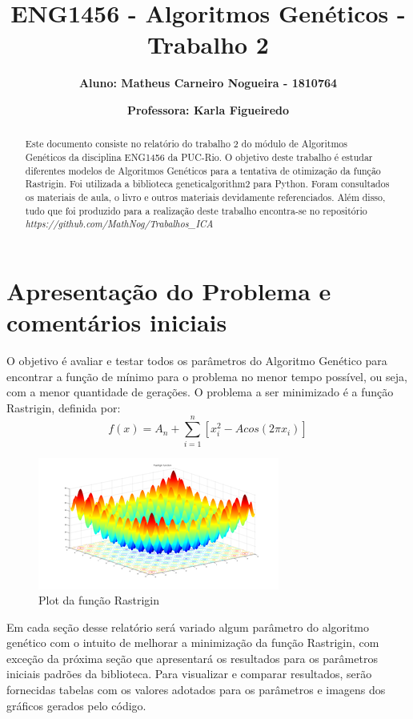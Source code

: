 \documentclass[12pt]{article}
\title{\textbf{ENG1456 - Algoritmos Genéticos - Trabalho 2}}
\author{\textbf{Aluno: Matheus Carneiro Nogueira - 1810764}}
\affil{}
\author{\textbf{Professora: Karla Figueiredo}}
\affil{}
\date{}
\begin{document}
	\maketitle
	
	
\begin{abstract}
	Este documento consiste no relatório do trabalho 2 do módulo de Algoritmos Genéticos da disciplina ENG1456 da PUC-Rio. O objetivo deste trabalho é estudar diferentes modelos de Algoritmos Genéticos para a tentativa de otimização da função Rastrigin. Foi utilizada a biblioteca geneticalgorithm2 para Python. Foram consultados os materiais de aula, o livro \cite{davis1991handbook} e outros materiais devidamente referenciados. Além disso, tudo que foi produzido para a realização deste trabalho encontra-se no repositório \textit{https://github.com/MathNog/Trabalhos\_ICA}
\end{abstract}
	
\section{Apresentação do Problema e comentários iniciais}

O objetivo é avaliar e testar todos os parâmetros do Algoritmo Genético para encontrar a função de mínimo para o problema no menor tempo possível, ou seja, com a menor quantidade de gerações. O problema a ser minimizado é a função Rastrigin, definida por:
\begin{equation*}
	f(x)=A_n+\sum_{i=1}^{n}[x_i^2-Acos(2\pi x_i)]
\end{equation*}

\begin{figure}[H]
	\centering
	\includegraphics[width=0.7\linewidth]{Imagens/Rastrigin_function}
	\caption{Plot da função Rastrigin}
	\label{fig:rastriginfunction}
\end{figure}

Em cada seção desse relatório será variado algum parâmetro do algoritmo genético com o intuito de melhorar a minimização da função Rastrigin, com exceção da próxima seção que apresentará os resultados para os parâmetros iniciais padrões da biblioteca. Para visualizar e comparar resultados, serão fornecidas tabelas com os valores adotados para os parâmetros e imagens dos gráficos gerados pelo código.
\end{document}
